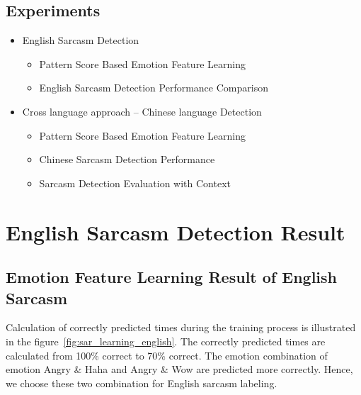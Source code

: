 \documentclass[12pt,a4paper]{report}
\theoremstyle{definition}
\begin{document}
\begin{CJK}{UTF8}{bsmi}
    \subsection{Experiments}
    \begin{itemize}
        \item English Sarcasm Detection
        \begin{itemize}
            \item Pattern Score Based Emotion Feature Learning
            \item English Sarcasm Detection Performance Comparison
        \end{itemize}
        \item Cross language approach – Chinese language Detection
        \begin{itemize}
            \item Pattern Score Based Emotion Feature Learning
            \item Chinese Sarcasm Detection Performance
            \item Sarcasm Detection Evaluation with Context
        \end{itemize}
    \end{itemize}
    \section{English Sarcasm Detection Result}
        \subsection{Emotion Feature Learning Result of English Sarcasm}
        \par Calculation of correctly predicted times during the training process is illustrated in the figure~\ref{fig:sar_learning_english}.
        The correctly predicted times are calculated from 100\% correct to 70\% correct. The emotion combination of emotion Angry \& Haha and Angry \& Wow are predicted more correctly. Hence, we choose these two combination for English sarcasm labeling.
        

\end{CJK}
\end{document}
